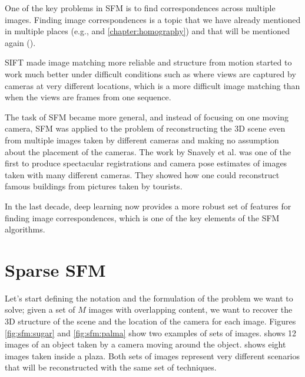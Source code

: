 



One of the key problems in SFM is to find correspondences across multiple images. Finding image correspondences is a topic that we have already mentioned in multiple places (e.g., \chap{\ref{chap:stereo_vision}} and \ref{chapter:homography}) and that will be mentioned again (\chap{\ref{chap:optical_flow_estimation}}).

SIFT \cite{Lowe04} made image matching more reliable and structure from motion started to work much better under difficult conditions such as where views are captured by cameras at very different locations, which is a more difficult image matching than when the views are frames from one sequence.


The task of SFM became more general, and instead of focusing on one moving camera, SFM was applied to the problem of reconstructing the 3D scene even from multiple images taken by different cameras and making no assumption about the placement of the cameras.  The work by Snavely et al. \cite{Snavely2006} was one of the first to produce spectacular registrations and camera pose estimates of images taken with many different cameras. They showed how one could reconstruct famous buildings from pictures taken by tourists.

In the last decade, deep learning now provides a more robust set of features for finding image correspondences, which is one of the key elements of the SFM algorithms.



\section{Sparse SFM}

Let's start defining the notation and the formulation of the problem we want to solve; given a set of $M$ images with overlapping content, we want to recover the 3D structure of the scene and the location of the camera for each image. Figures \ref{fig:sfm:sugar} and \ref{fig:sfm:palma} show two examples of sets of images. \Fig{\ref{fig:sfm:sugar}} shows 12 images of an object taken by a camera moving around the object. \Fig{\ref{fig:sfm:palma}} shows eight images taken inside a plaza. Both sets of images represent very different scenarios that will be reconstructed with the same set of techniques.


